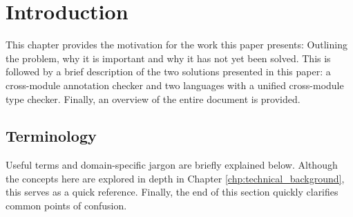 \documentclass[a4paper,12pt,twoside,openright]{report}
\begin{document}
\pagestyle{empty}
\singlespacing

\onehalfspacing

\singlespacing


\setcounter{page}{0}
\pagestyle{plain}
\tableofcontents

\onehalfspacing


\chapter{Introduction}
\setcounter{page}{1}

This chapter provides the motivation for the work this paper presents:
Outlining the problem, why it is important and why it has not yet been solved.
This is followed by a brief description of the two solutions presented in this
paper: a cross-module annotation checker and two languages with a unified
cross-module type checker. Finally, an overview of the entire document is
provided.

\section{Terminology}

Useful terms and domain-specific jargon are briefly explained below. Although
the concepts here are explored in depth in Chapter
\ref{chp:technical_background}, this serves as a quick reference. Finally, the
end of this section quickly clarifies common points of confusion.
\end{document}
